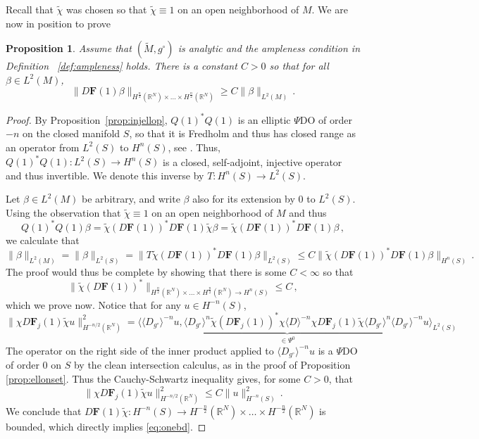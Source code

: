 \documentclass[11pt]{amsart}
\newtheorem{Proposition}[Theorem]{Proposition}
\theoremstyle{definition}
\numberwithin{equation}{section}
\newcommand{\mR}{\mathbb{R}}                    %
\newcommand{\norm}[1]{\lVert #1 \rVert}         %
\begin{document}
Recall that $\tilde{\chi}$ was chosen so that $\tilde{\chi}\equiv 1$ on an open neighborhood of $M$. We are now in position to prove
\begin{Proposition}\label{prop:lowerbd}
	Assume that $(\widetilde{M},g^\circ)$ is analytic and the ampleness condition in Definition ~\ref{def:ampleness} holds. %
	There is a constant $C>0$ so that for all $\beta \in L^2(M)$,%
	\[
		\norm{D\mathbf{F}(1)\beta}_{H^{\frac{n}{2}}(\mR^{N})\times\dots\times H^{\frac{n}{2}}(\mR^{N})} \geq C\norm{\beta}_{L^2(M)}\,.
	\]
\end{Proposition}
\begin{proof}
	By Proposition~\ref{prop:injellop}, $Q(1)^\ast Q(1)$ is an elliptic $\Psi$DO of order $-n$ on the closed manifold $S$, so that it is Fredholm and thus has closed range as an operator from $L^2(S)$ to $H^{n}(S)$, see \cite[Thm.~8.1]{MR1852334}. Thus, $Q(1)^\ast Q(1) \colon L^2(S) \to H^{n}(S)$ is a closed, self-adjoint, injective operator and thus invertible. We denote this inverse by $T\colon H^{n}(S)\to L^2(S)$. 

	Let $\beta \in L^2(M)$ be arbitrary, and write $\beta$ also for its extension by $0$ to $L^2(S)$. Using the observation that $\tilde{\chi} \equiv 1$ on an open neighborhood of $M$ and thus
	\[
		Q(1)^\ast Q(1)\beta =  \tilde{\chi}(D\mathbf{F}(1))^\ast D\mathbf{F}(1)\tilde{\chi}\beta =\tilde{\chi}(D\mathbf{F}(1))^\ast D\mathbf{F}(1)\beta\,,
	\]
	we calculate that
	\[
		\norm{\beta}_{L^2(M)} = \norm{\beta}_{L^2(S)} = \norm{T \tilde{\chi}(D\mathbf{F}(1))^\ast D\mathbf{F}(1)\beta}_{L^2(S)} \leq C\norm{\tilde{\chi}(D\mathbf{F}(1))^\ast D\mathbf{F}(1)\beta}_{H^{n}(S)}\,.
	\]
	The proof would thus be complete by showing that there is some $C<\infty$ so that
	\begin{equation}\label{eq:onebd}
	\norm{\tilde{\chi}(D\mathbf{F}(1))^\ast}_{H^{\frac{n}{2}}(\mR^{N})\times\dots\times H^{\frac{n}{2}}(\mR^{N})\to H^n(S)} \leq C\,,
	\end{equation}
	which we prove now. Notice that for any $u\in H^{-n}(S)$, 
	\[
		\norm{\chi D\mathbf{F}_j(1) \tilde{\chi} u}_{H^{-n/2}(\mR^{N})}^2 = \langle \langle D_{g^\circ}\rangle^{-n}u, \underbrace{\langle D_{g^\circ}\rangle^{n} \tilde{\chi}(D\mathbf{F}_j(1))^\ast \chi \langle D\rangle^{-n} \chi D\mathbf{F}_j(1) \tilde{\chi}\langle D_{g^\circ}\rangle^n}_{\in \Psi^0} \langle D_{g^\circ}\rangle^{-n} u\rangle_{L^2(S)} %
	\]
	The operator on the right side of the inner product applied to $\langle D_{g^\circ}\rangle^{-n} u$ is a $\Psi$DO of order $0$ on $S$ by the clean intersection calculus, as in the proof of Proposition \ref{prop:ellonset}. Thus the Cauchy-Schwartz inequality gives, for some $C>0$, that 
	\[
		\norm{\chi D\mathbf{F}_j(1) \tilde{\chi} u}_{H^{-n/2}(\mR^{N})}^2\leq C\norm{u}_{H^{-n}(S)}^2\,.
	\]
	We conclude that %
	$D\mathbf{F}(1)\tilde{\chi} \colon H^{-n}(S) \to H^{-\frac{n}{2}}(\mR^{N})\times\dots\times H^{-\frac{n}{2}}(\mR^{N})$ is bounded, which directly implies \eqref{eq:onebd}.
\end{proof}	
\end{document}
